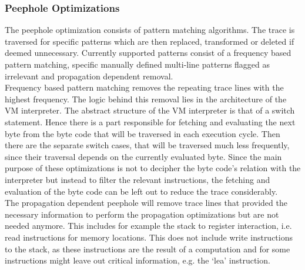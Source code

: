 \documentclass[10pt,twoside,a4paper,bibliography=totoc]{scrbook}
\begin{document}
\subsubsection{Peephole Optimizations}
The peephole optimization consists of pattern matching algorithms. 
The trace is traversed for specific patterns which are then replaced, transformed or deleted if deemed unnecessary. 
Currently supported patterns consist of a frequency based pattern matching, specific manually defined multi-line patterns flagged as irrelevant and propagation dependent removal.\\
Frequency based pattern matching removes the repeating trace lines with the highest frequency. The logic behind this removal lies in the architecture of the VM interpreter. 
The abstract structure of the VM interpreter is that of a switch statement. 
Hence there is a part responsible for fetching and evaluating the next byte from the byte code that will be traversed in each execution cycle. 
Then there are the separate switch cases, that will be traversed much less frequently, since their traversal depends on the currently evaluated byte.
Since the main purpose of these optimizations is not to decipher the byte code's relation with the interpreter but instead to filter the relevant instructions, the fetching and evaluation of the byte code can be left out to reduce the trace considerably. \\
The propagation dependent peephole will remove trace lines that provided the necessary information to perform the propagation optimizations but are not needed anymore.
This includes for example the stack to register interaction, i.e. read instructions for memory locations. This does not include write instructions to the stack, as these instructions are the result of a computation and for some instructions might leave out critical information, e.g. the `lea' instruction. 
\end{document}
